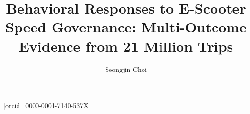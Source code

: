 \documentclass[a4paper,fleqn]{cas-sc}
\begin{document}
\let\WriteBookmarks\relax
\def\floatpagepagefraction{1}
\def\textpagefraction{.001}

\title[mode=title]{Behavioral Responses to E-Scooter Speed Governance: Multi-Outcome Evidence from 21 Million Trips}

\author[1]{Seongjin Choi}[orcid=0000-0001-7140-537X]
\cormark[1]

\address[1]{Department of Civil, Environmental, and Geo- Engineering, University of Minnesota, 500 Pillsbury Dr.\ SE, Minneapolis, MN 55455, USA}

\end{document}
